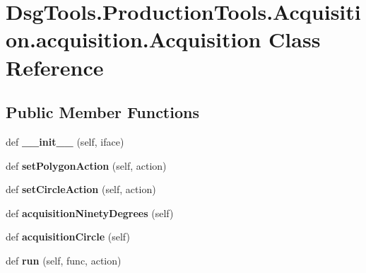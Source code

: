 \hypertarget{class_dsg_tools_1_1_production_tools_1_1_acquisition_1_1acquisition_1_1_acquisition}{}\section{Dsg\+Tools.\+Production\+Tools.\+Acquisition.\+acquisition.\+Acquisition Class Reference}
\label{class_dsg_tools_1_1_production_tools_1_1_acquisition_1_1acquisition_1_1_acquisition}
\subsection*{Public Member Functions}
\begin{DoxyCompactItemize}
\item 
\mbox{\label{class_dsg_tools_1_1_production_tools_1_1_acquisition_1_1acquisition_1_1_acquisition_a0026cc51fed260e81e5912ee4d4a44a2}} 
def {\bfseries \+\_\+\+\_\+init\+\_\+\+\_\+} (self, iface)
\item 
\mbox{\label{class_dsg_tools_1_1_production_tools_1_1_acquisition_1_1acquisition_1_1_acquisition_a147aed022aab9caf537cf1fcc6d70e93}} 
def {\bfseries set\+Polygon\+Action} (self, action)
\item 
\mbox{\label{class_dsg_tools_1_1_production_tools_1_1_acquisition_1_1acquisition_1_1_acquisition_abb200c8306a09cf731f721ff8b65e314}} 
def {\bfseries set\+Circle\+Action} (self, action)
\item 
\mbox{\label{class_dsg_tools_1_1_production_tools_1_1_acquisition_1_1acquisition_1_1_acquisition_a4438a3aad1023de9eddc712bb7174998}} 
def {\bfseries acquisition\+Ninety\+Degrees} (self)
\item 
\mbox{\label{class_dsg_tools_1_1_production_tools_1_1_acquisition_1_1acquisition_1_1_acquisition_ae1f0f4972f3216ca349e75df53ffe545}} 
def {\bfseries acquisition\+Circle} (self)
\item 
\mbox{\label{class_dsg_tools_1_1_production_tools_1_1_acquisition_1_1acquisition_1_1_acquisition_ae7c16ab6edde27b85958ab3340ecd8db}} 
def {\bfseries run} (self, func, action)
\end{DoxyCompactItemize}
